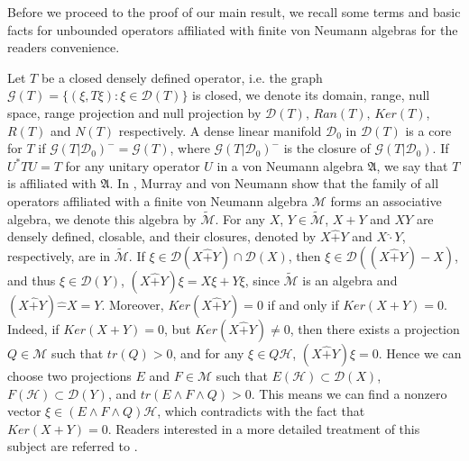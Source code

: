 \documentclass[12pt]{article}
\newcommand{\AAA}{\mathfrak A}
\newcommand{\DDD}{\mathcal D}
\newcommand{\HHH}{\mathcal H} %
\newcommand{\MMM}{\mathcal M}
\begin{document}
{\vspace{2mm}
Before we proceed to the proof of our main result, we recall some terms and basic facts for
unbounded operators affiliated with finite von Neumann algebras for the readers convenience.

Let $T$ be a closed densely defined operator, i.e. the graph $\mathcal{G}(T) = \{(\xi, T\xi): \xi \in \DDD(T) \}$ is closed, 
we denote its  domain, range, null space,
range projection and null projection by $\DDD(T),\,
Ran(T),\, Ker(T)$, $R(T)$ and $N(T)$ respectively.
A dense linear manifold $\DDD_{0}$ in $\DDD(T)$ is a core for $T$ if 
$\mathcal{G}(T| \DDD_{0})^{-} = \mathcal{G}(T)$, where $\mathcal{G}(T| \DDD_{0})^{-}$ is
the closure of $\mathcal{G}(T| \DDD_{0})$. If $U^{*}TU = T$  for any unitary operator $U$ in a von Neumann algebra $\AAA$,
we say that $T$ is affiliated with $\AAA$.
In \cite{MV}, Murray and von Neumann show that the family of all operators affiliated with
a finite von Neumann algebra $\MMM$ forms an associative algebra, we denote this
algebra by $\widetilde{\MMM}$. 
For any $X$, $Y \in \widetilde{\MMM}$, $X
+Y$ and $XY$ are densely defined, closable, and their closures,
denoted by $X \widehat{+} Y$ and $X\widehat{\cdot} Y$, respectively,
are in $\widetilde{\MMM}$.  If $\xi \in \DDD(X \widehat{+} Y) \cap \DDD(X)$, then $\xi \in
\DDD((X \widehat{+} Y) - X)$, and thus $\xi \in \DDD(Y)$, $(X
\widehat{+} Y)\xi = X\xi + Y\xi$, since $\widetilde{\MMM}$ is an
algebra and $(X \widehat{+} Y) \widehat{-} X = Y$. Moreover, $Ker(X \widehat{+} Y) = 0$ if and only if $Ker(X +Y) =
0$. Indeed, if $Ker(X +Y) = 0$, but $Ker(X \widehat{+} Y) \neq 0 $,
then there exists a projection $Q \in \MMM$ such that $tr(Q)> 0$,
and for any $\xi \in Q \HHH$, $(X \widehat{+} Y)\xi = 0$. Hence we
can choose two projections $E$ and $F \in \MMM$ such that $E(\HHH)
\subset \DDD(X)$, $F(\HHH) \subset \DDD(Y)$, and $tr(E \wedge F
\wedge Q) > 0$. This means we can find a nonzero vector $\xi \in (E
\wedge F \wedge Q) \HHH$, which contradicts with the fact that
$Ker(X +Y) = 0$.  Readers interested in a more detailed treatment of this subject are
referred to \cite{Zhe}.



}
\end{document}
